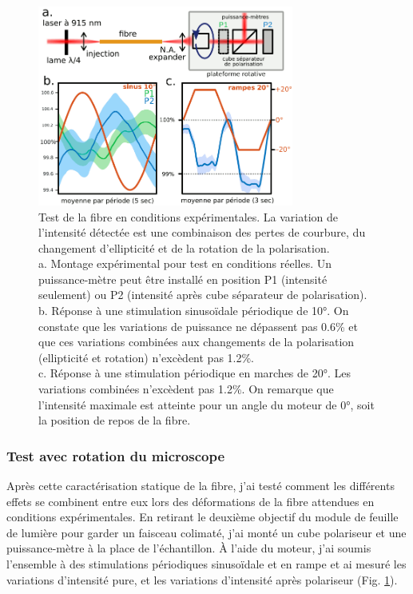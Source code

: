 \begin{figure}
    \centering
    \includegraphics[width=0.75\textwidth]{./files/real-condition_intensity-variation.svg.png}
    \caption{Test de la fibre en conditions expérimentales. La variation de l'intensité détectée est une combinaison des pertes de courbure, du changement d'ellipticité et de la rotation de la polarisation. 
    \\ a. Montage expérimental pour test en conditions réelles. Un puissance-mètre peut être installé en position P1 (intensité seulement) ou P2 (intensité après cube séparateur de polarisation).
    \\ b. Réponse à une stimulation sinusoïdale périodique de 10°. On constate que les variations de puissance ne dépassent pas 0.6\% et que ces variations combinées aux changements de la polarisation (ellipticité et rotation) n'excèdent pas 1.2\%.
    \\ c. Réponse à une stimulation périodique en marches de 20°. Les variations combinées n'excèdent pas 1.2\%. On remarque que l'intensité maximale est atteinte pour un angle du moteur de 0°, soit la position de repos de la fibre.
    \label{FIGrealconditionsfiber}}
    \end{figure}


\subsubsection{Test avec rotation du microscope}

Après cette caractérisation statique de la fibre, j'ai testé comment les différents effets se combinent entre eux lors des déformations de la fibre attendues en conditions expérimentales. En retirant le deuxième objectif du module de feuille de lumière pour garder un faisceau colimaté, j'ai monté un cube polariseur et une puissance-mètre à la place de l'échantillon. À l'aide du moteur, j'ai soumis l'ensemble à des stimulations périodiques sinusoïdale et en rampe et ai mesuré les variations d'intensité pure, et les variations d'intensité après polariseur (Fig. \ref{FIGrealconditionsfiber}).

